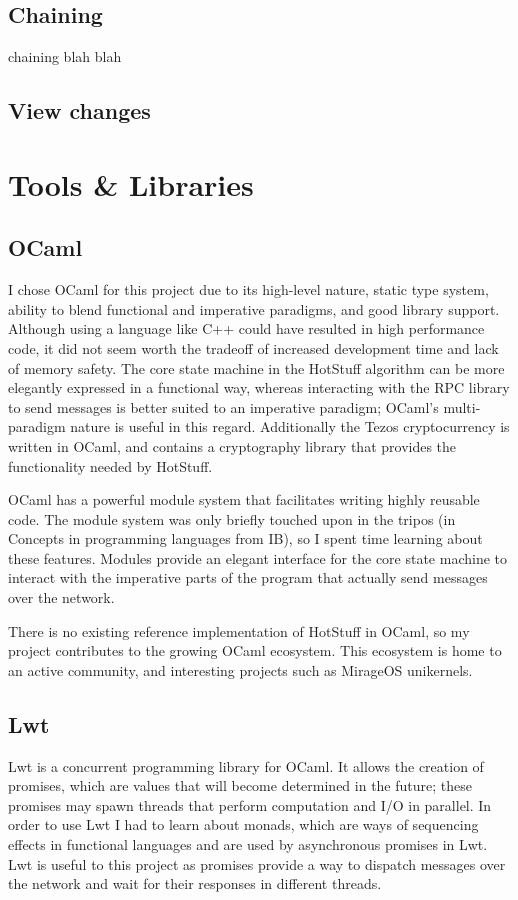 \subsection{Chaining}
chaining blah blah
\subsection{View changes}
\section{Tools \& Libraries}
\subsection{OCaml}
I chose OCaml for this project due to its high-level nature, static type system, ability to blend functional and imperative paradigms, and good library support. Although using a language like C++ could have resulted in high performance code, it did not seem worth the tradeoff of increased development time and lack of memory safety. The core state machine in the HotStuff algorithm can be more elegantly expressed in a functional way, whereas interacting with the RPC library to send messages is better suited to an imperative paradigm; OCaml's multi-paradigm nature is useful in this regard. Additionally the Tezos cryptocurrency is written in OCaml, and contains a cryptography library that provides the functionality needed by HotStuff.

OCaml has a powerful module system that facilitates writing highly reusable code. The module system was only briefly touched upon in the tripos (in Concepts in programming languages from IB), so I spent time learning about these features. Modules provide an elegant interface for the core state machine to interact with the imperative parts of the program that actually send messages over the network.

There is no existing reference implementation of HotStuff in OCaml, so my project contributes to the growing OCaml ecosystem. This ecosystem is home to an active community, and interesting projects such as MirageOS unikernels.
\subsection{Lwt}
Lwt is a concurrent programming library for OCaml. It allows the creation of promises, which are values that will become determined in the future; these promises may spawn threads that perform computation and I/O in parallel. In order to use Lwt I had to learn about monads, which are ways of sequencing effects in functional languages and are used by asynchronous promises in Lwt. Lwt is useful to this project as promises provide a way to dispatch messages over the network and wait for their responses in different threads.
